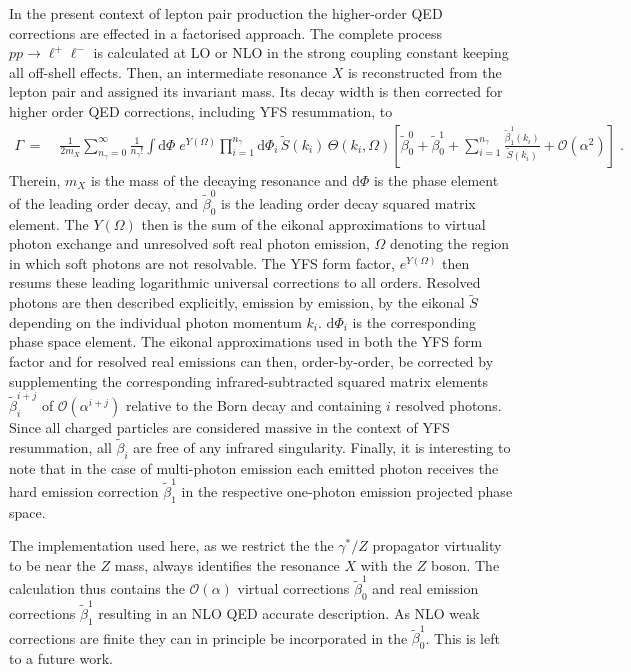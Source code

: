 \documentclass[11pt]{cernrep}
\newcommand{\order}{\mathcal{O}	}
\begin{document}
In the present context of lepton pair production the higher-order 
QED corrections are effected in a factorised approach. The complete 
process $pp\to\ell^+\ell^-$ is calculated at LO or NLO in the strong 
coupling constant keeping all off-shell effects. Then, an intermediate 
resonance $X$ is reconstructed from the lepton pair and assigned its 
invariant mass. Its decay width is then corrected for higher order 
QED corrections, including YFS resummation, to 
\begin{equation}
  \begin{split}\label{eq:dyew:comp:yfs}
    \Gamma
    \,=\;&
      \frac{1}{2m_X}\sum\limits_{n_\gamma=0}^\infty\frac{1}{n_\gamma !}
      \int\mathrm{d}\Phi\;e^{Y(\Omega)}
      \prod\limits_{i=1}^{n_\gamma}\mathrm{d}\Phi_i\,\tilde{S}(k_i)\,\Theta(k_i,\Omega)
      \left[
        \tilde\beta_0^0
        +\tilde\beta_0^1
        +\sum\limits_{i=1}^{n_\gamma}\frac{\tilde\beta_1^1(k_i)}{\tilde{S}(k_i)}
        +\order(\alpha^2)
      \right]\;.
  \end{split}
\end{equation}
Therein, $m_X$ is the mass of the decaying resonance and $\mathrm{d}\Phi$ 
is the phase element of the leading order decay, and $\tilde\beta_0^0$ is 
the leading order decay squared matrix element. The $Y(\Omega)$ then 
is the sum of the eikonal approximations to virtual photon exchange and 
unresolved soft real photon emission, $\Omega$ denoting the region in which 
soft photons are not resolvable. The YFS form factor, $e^{Y(\Omega)}$ then 
resums these leading logarithmic universal corrections to all orders. 
Resolved photons are then described explicitly, emission by emission, 
by the eikonal $\tilde{S}$ depending on the individual photon momentum 
$k_i$. $\mathrm{d}\Phi_i$ is the corresponding phase space element. The 
eikonal approximations used in both the YFS form factor and for 
resolved real emissions can then, order-by-order, be corrected by 
supplementing the corresponding infrared-subtracted squared matrix 
elements $\tilde\beta_i^{i+j}$ of $\order(\alpha^{i+j})$ relative to 
the Born decay and containing $i$ resolved photons. Since all charged 
particles are considered massive in the context of YFS resummation, 
all $\tilde\beta_i$ are free of any infrared singularity. Finally, it is 
interesting to note that in the case of multi-photon emission 
each emitted photon receives the hard emission correction $\tilde\beta_1^1$ 
in the respective one-photon emission projected phase space.

The implementation used here, as we restrict the the $\gamma^*/Z$ propagator 
virtuality to be near the $Z$ mass, always identifies the resonance $X$ with 
the $Z$ boson. The calculation thus contains the $\order(\alpha)$ virtual 
corrections $\tilde\beta_0^1$ and real emission corrections $\tilde\beta_1^1$ 
resulting in an NLO QED accurate description. As NLO weak corrections 
are finite they can in principle be incorporated in the $\tilde\beta_0^1$. 
This is left to a future work.
\end{document}
